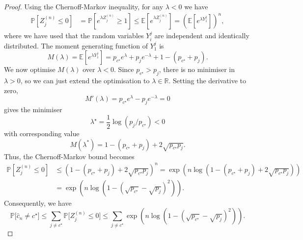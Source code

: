 \begin{proof}
    Using the Chernoff-Markov inequality, for any $\lambda<0$ we have
    \begin{align*}
    \mathbb{P}\left[Z_j^{(n)}\leq 0\right] &= \mathbb{P}\left[e^{\lambda Z_j^{(n)}}\geq 1\right] \leq \mathbb{E}\left[e^{\lambda Z_j^{(n)}}\right] 
    = \left(\mathbb{E}\left[e^{\lambda Y_1^j}\right]\right)^n,
    \end{align*}
where we have used that the random variables $Y_i^j$ are independent and identically distributed. The moment generating function of $Y_1^j$ is 
$$
M(\lambda) = \mathbb{E}\left[e^{\lambda Y_1^j}\right] = p_{c^\star} e^{\lambda} + p_j e^{-\lambda} + 1- (p_{c^\star}+p_j).
$$
We now optimise $M(\lambda)$ over $\lambda<0$.
Since $p_{c^\star} > p_j$, there is no minimiser in $\lambda > 0$, so we can just extend the optimisation to $\lambda \in \mathbb{R}$.
    Setting the derivative to zero,
    $$M'(\lambda) = p_{c^\star} e^{\lambda} - p_j e^{-\lambda} = 0$$
    gives the minimiser 
    \begin{equation*}
    \lambda^\star = \frac{1}{2}\log(p_j/p_{c^\star}) < 0
    \end{equation*}
    with corresponding value
$$
M(\lambda^*) = 1-(p_{c^\star}+p_j) + 2\sqrt{p_{c^\star}p_j}.
$$
Thus, the Chernoff-Markov bound becomes
\begin{align*}  
\mathbb{P}\left[Z_j^{(n)}\leq 0\right]&\leq \left(1-(p_{c^\star}+p_j) + 2\sqrt{p_{c^\star}p_j}\right)^n = \exp\left(n\log\left(1-(p_{c^\star}+p_j) + 2\sqrt{p_{c^\star}p_j}\right)\right)\\
& = \exp\left(n\log\left(1-(\sqrt{p_{c^\star}}-\sqrt{p_j})^2\right)\right).
\end{align*}
Consequently, we have
$$
\mathbb{P}\bigl[\hat{c}_n\neq c^\star\bigr]
\le \sum_{j\neq c^\star}\mathbb{P}\bigl[Z_j^{(n)}\le 0\bigr]
\le \sum_{j\neq c^\star} \exp\left(n\log\left(1-(\sqrt{p_{c^\star}}-\sqrt{p_j})^2\right)\right).
$$
\end{proof}